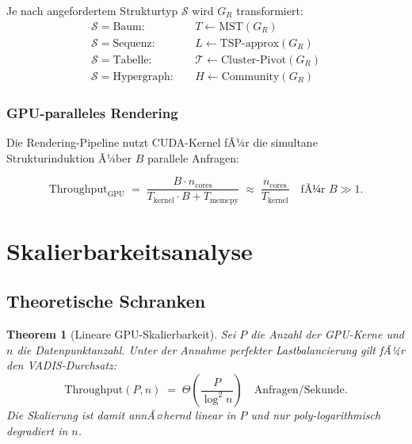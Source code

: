 ﻿\documentclass[12pt,a4paper]{article}
\newtheorem{theorem}{Theorem}[section]
\begin{document}
Je nach angefordertem Strukturtyp $\mathcal{S}$ wird $G_R$ transformiert:
\begin{align}
  \mathcal{S} = \text{Baum}:&\quad T \gets \text{MST}(G_R)\\
  \mathcal{S} = \text{Sequenz}:&\quad L \gets \text{TSP-approx}(G_R)\\
  \mathcal{S} = \text{Tabelle}:&\quad \mathcal{T} \gets \text{Cluster-Pivot}(G_R)\\
  \mathcal{S} = \text{Hypergraph}:&\quad H \gets \text{Community}(G_R)
\end{align}

\subsubsection{GPU-paralleles Rendering}

Die Rendering-Pipeline nutzt CUDA-Kernel fÃ¼r die simultane 
Strukturinduktion Ã¼ber $B$ parallele Anfragen:

\begin{equation}
  \text{Throughput}_{\text{GPU}} \;=\; \frac{B \cdot n_{\text{cores}}}
    {T_{\text{kernel}} \cdot B + T_{\text{memcpy}}}
  \;\approx\; \frac{n_{\text{cores}}}{T_{\text{kernel}}}
  \quad \text{fÃ¼r } B \gg 1.
\end{equation}

\section{Skalierbarkeitsanalyse}
\label{sec:skalierung}

\subsection{Theoretische Schranken}

\begin{theorem}[Lineare GPU-Skalierbarkeit]
\label{thm:gpuscale}
Sei $P$ die Anzahl der GPU-Kerne und $n$ die Datenpunktanzahl. 
Unter der Annahme perfekter Lastbalancierung gilt fÃ¼r den 
VADIS-Durchsatz:
\[
  \text{Throughput}(P, n) \;=\; \Theta\!\left(\frac{P}{\log^2 n}\right)
  \quad \text{Anfragen/Sekunde}.
\]
Die Skalierung ist damit annÃ¤hernd \emph{linear} in $P$ und nur 
\emph{poly-logarithmisch} degradiert in $n$.
\end{theorem}
\end{document}
